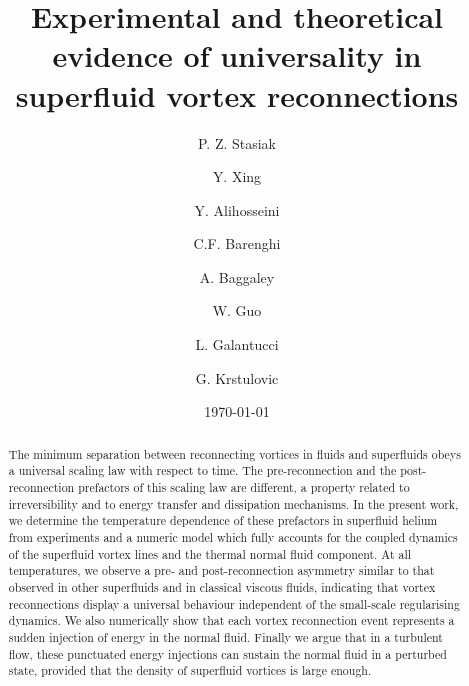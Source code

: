 \documentclass[%
 reprint,
unsortedaddress,
 amsmath,amssymb,
 aps,
 prl,
]{revtex4-2}
\begin{document}

\title{Experimental and theoretical evidence of universality in superfluid vortex reconnections}

\author{P. Z. Stasiak}

\author{Y. Xing}
\author{Y. Alihosseini}

\author{C.F. Barenghi}
\author{A. Baggaley}

\author{W. Guo}

\author{L. Galantucci}

\author{G. Krstulovic}


\date{\today}%

\begin{abstract}
The minimum separation between reconnecting vortices
in fluids and superfluids obeys a universal scaling law with respect to time.
The pre-reconnection and the post-reconnection prefactors 
of this scaling law are different, a property related to irreversibility and to energy
transfer and dissipation mechanisms.
In the present work, we determine the temperature dependence of these prefactors in superfluid helium
from experiments and a numeric model which fully accounts for the 
coupled dynamics of the superfluid
vortex lines and the thermal normal fluid component. At all temperatures, we observe 
a pre- and post-reconnection asymmetry similar to that observed in other superfluids
and in classical viscous fluids, indicating that vortex reconnections display a
universal behaviour independent of 
the small-scale regularising dynamics.   
We also numerically show that each vortex reconnection event
represents a sudden injection of energy in the normal fluid. 
Finally we argue that
in a turbulent flow, these punctuated energy injections can sustain 
the normal fluid
in a perturbed state, provided that the density of superfluid vortices is large enough.
\end{abstract}
\end{document}
